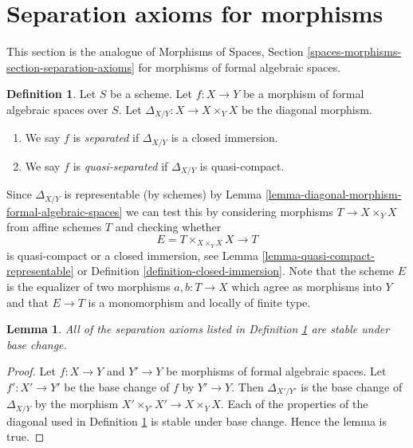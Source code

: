 \documentclass{stacks-project}
\theoremstyle{plain}
\newtheorem{lemma}[subsection]{Lemma}
\theoremstyle{definition}
\newtheorem{definition}[subsection]{Definition}
\theoremstyle{remark}
\numberwithin{equation}{subsection}
\begin{document}
\section{Separation axioms for morphisms}
\label{section-separation-axioms}

\noindent
This section is the analogue of
Morphisms of Spaces, Section \ref{spaces-morphisms-section-separation-axioms}
for morphisms of formal algebraic spaces.

\begin{definition}
\label{definition-separated-morphism}
Let $S$ be a scheme.
Let $f : X \to Y$ be a morphism of formal algebraic spaces over $S$.
Let $\Delta_{X/Y} : X \to X \times_Y X$ be the diagonal morphism.
\begin{enumerate}
\item We say $f$ is {\it separated} if $\Delta_{X/Y}$ is a closed immersion.
\item We say $f$ is {\it quasi-separated} if $\Delta_{X/Y}$ is quasi-compact.
\end{enumerate}
\end{definition}

\noindent
Since $\Delta_{X/Y}$ is representable (by schemes) by
Lemma \ref{lemma-diagonal-morphism-formal-algebraic-spaces}
we can test this by considering morphisms $T \to X \times_Y X$
from affine schemes $T$ and checking whether
$$
E = T \times_{X \times_Y X} X \longrightarrow T
$$
is quasi-compact or a closed immersion, see
Lemma \ref{lemma-quasi-compact-representable} or
Definition \ref{definition-closed-immersion}.
Note that the scheme $E$ is the equalizer of two morphisms
$a, b : T \to X$ which agree as morphisms into $Y$
and that $E \to T$ is a monomorphism and locally of finite type.

\begin{lemma}
\label{lemma-base-change-separated}
All of the separation axioms listed in
Definition \ref{definition-separated-morphism}
are stable under base change.
\end{lemma}

\begin{proof}
Let $f : X \to Y$ and $Y' \to Y$ be morphisms of formal algebraic spaces.
Let $f' : X' \to Y'$ be the base change of $f$ by $Y' \to Y$. Then
$\Delta_{X'/Y'}$ is the base change of $\Delta_{X/Y}$ by
the morphism $X' \times_{Y'} X' \to X \times_Y X$. Each of the properties
of the diagonal used in Definition \ref{definition-separated-morphism}
is stable under base change. Hence the lemma is true.
\end{proof}
\end{document}
